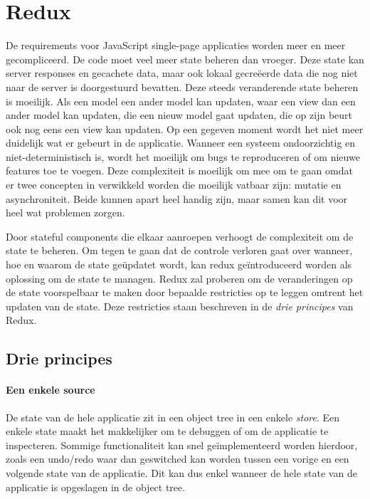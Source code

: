 \section{Redux}
De requirements voor JavaScript single-page applicaties worden meer en meer gecompliceerd. De code moet veel meer state beheren dan vroeger. Deze state kan server responses en gecachete data, maar ook lokaal gecreëerde data die nog niet naar de server is doorgestuurd bevatten. Deze steeds veranderende state beheren is moeilijk. Als een model een ander model kan updaten, waar een view dan een ander model kan updaten, die een nieuw model gaat updaten, die op zijn beurt ook nog eens een view kan updaten. Op een gegeven moment wordt het niet meer duidelijk wat er gebeurt in de applicatie. Wanneer een systeem ondoorzichtig en niet-deterministisch is, wordt het moeilijk om bugs te reproduceren of om nieuwe features toe te voegen. Deze complexiteit is moeilijk om mee om te gaan omdat er twee concepten in verwikkeld worden die moeilijk vatbaar zijn: mutatie en asynchroniteit. Beide kunnen apart heel handig zijn, maar samen kan dit voor heel wat problemen zorgen.

Door stateful components die elkaar aanroepen verhoogt de complexiteit om de state te beheren. Om tegen te gaan dat de controle verloren gaat over wanneer, hoe en waarom de state geüpdatet wordt, kan redux geïntroduceerd worden als oplossing om de state te managen. Redux zal proberen om de veranderingen op de state voorspelbaar te maken door bepaalde restricties op te leggen omtrent het updaten van de state. Deze restricties staan beschreven in de \textit{drie principes} van Redux.

\subsection{Drie principes}

\paragraph{Een enkele source}  
De state van de hele applicatie zit in een object tree in een enkele \textit{store}. Een enkele state maakt het makkelijker om te debuggen of om de applicatie te inspecteren. Sommige functionaliteit kan snel geïmplementeerd worden hierdoor, zoals een undo/redo waar dan geswitched kan worden tussen een vorige en een volgende state van de applicatie. Dit kan dus enkel wanneer de hele state van de applicatie is opgeslagen in de object tree.

